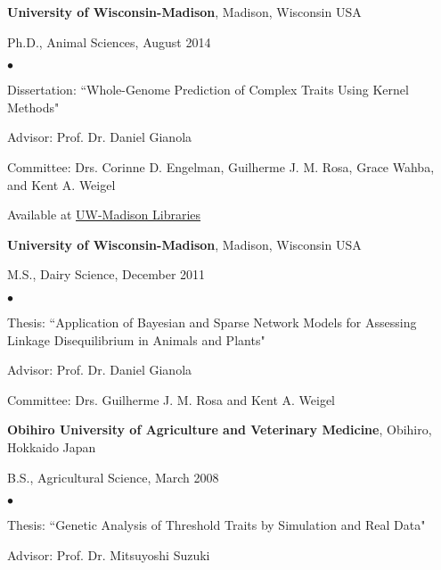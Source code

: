 \documentclass[margin,line,10pt]{res}
\newenvironment{list1}{
  \begin{list}{\ding{113}}{%
      \setlength{\itemsep}{0in}
      \setlength{\parsep}{0in} \setlength{\parskip}{0in}
      \setlength{\topsep}{0in} \setlength{\partopsep}{0in} 
      \setlength{\leftmargin}{0.17in}}}{\end{list}}
\newenvironment{list2}{
  \begin{list}{$\bullet$}{%
      \setlength{\itemsep}{0in}
      \setlength{\parsep}{0in} \setlength{\parskip}{0in}
      \setlength{\topsep}{0in} \setlength{\partopsep}{0in} 
      \setlength{\leftmargin}{0.2in}}}{\end{list}}
\begin{document}
\begin{resume}
{\bf University of Wisconsin-Madison}, Madison, Wisconsin USA\\
\vspace*{-.1in}
\begin{list1}
\item[] Ph.D., Animal Sciences, August 2014
\begin{list2}
\vspace*{.05in}
\item Dissertation: ``Whole-Genome Prediction of Complex Traits Using Kernel Methods" 
\item Advisor: Prof. Dr. Daniel Gianola 
\item Committee: Drs. Corinne D. Engelman, Guilherme J. M. Rosa, Grace Wahba, and Kent A. Weigel
\item Available at  \textcolor{blue}{\href{https://search.library.wisc.edu/catalog/9910205835702121}{UW-Madison Libraries}} 
\end{list2}
\vspace*{.05in}
\end{list1}





{\bf University of Wisconsin-Madison}, Madison, Wisconsin USA\\
\vspace*{-.1in}
\begin{list1}
\item[] M.S., Dairy Science, December 2011
\begin{list2}
\vspace*{.05in}
\item Thesis: ``Application of Bayesian and Sparse Network Models for Assessing Linkage Disequilibrium in Animals and Plants" 
\item Advisor: Prof. Dr. Daniel Gianola 
\item Committee: Drs. Guilherme J. M. Rosa and Kent A. Weigel
\end{list2}
\vspace*{.05in}
\end{list1}


{\bf Obihiro University of Agriculture and Veterinary Medicine}, Obihiro, Hokkaido Japan\\
\vspace*{-.1in}
\begin{list1}
\item[] B.S., Agricultural Science,  March 2008
\begin{list2}
\vspace*{.05in}
\item Thesis:  ``Genetic Analysis of Threshold Traits by Simulation and Real Data" 
\item Advisor: Prof. Dr. Mitsuyoshi Suzuki
\end{list2}
\end{list1}





\end{resume}
\end{document}
